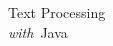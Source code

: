 \clearpage
\pagestyle{empty}
\cleardoublepage
\vspace*{1.75in}
\begin{center}
{\hfill \Huge Text Processing \\[4pt] \hfill {\LARGE\it with}\ Java}
\end{center}
